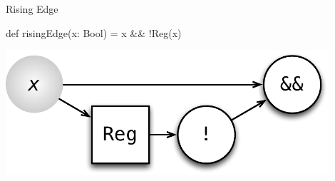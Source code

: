 \documentclass[xcolor=pdflatex,dvipsnames,table]{beamer}
\begin{document}
\begin{frame}[fragile]{Rising Edge}

\begin{scala}
def risingEdge(x: Bool) = x && !Reg(x)
\end{scala}

\begin{center}
\includegraphics[width=0.9\textwidth]{figs/rising-edge.pdf} 
\end{center}

\end{frame}
\end{document}
